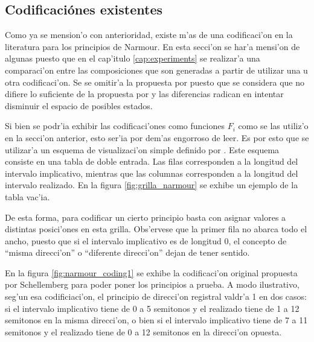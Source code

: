 \subsection{Codificaci\'ones existentes}
Como ya se mension'o con anterioridad, existe m'as de una codificaci'on en la literatura para los principios de Narmour. 
En esta secci'on se har'a mensi'on de algunas puesto que en el cap'itulo \ref{cap:experiments} se realizar'a una comparaci'on
entre las composiciones que son generadas a partir de utilizar una u otra codificaci'on. Se se omitir'a la propuesta por \cite{PaieThesis}
puesto que se considera que no difiere lo suficiente de la propuesta por \cite{Schellenberg97} y las diferencias radican en intentar disminuir
el espacio de posibles estados.


Si bien se podr'ia exhibir las codificaci'ones como funciones $F_i$ como se las utiliz'o en la secci'on anterior, esto ser'ia por dem'as engorroso de leer.
Es por esto que se utilizar'a un esquema de visualizaci'on simple definido por \cite{Narmour91}. Este esquema consiste en una tabla de doble entrada. 
Las filas corresponden a la longitud del intervalo implicativo, mientras que las columnas corresponden a la longitud del intervalo realizado.
En la figura \ref{fig:grilla_narmour} se exhibe un ejemplo de la tabla vac'ia.

\begin{imagen}
    \width{14cm}
\end{imagen}

De esta forma, para codificar un cierto principio basta con asignar valores a distintas posici'ones en esta grilla. Obs'ervese que la primer fila 
no abarca todo el ancho, puesto que si el intervalo implicativo es de longitud 0, el concepto de ``misma direcci'on'' o ``diferente direcci'on'' dejan
de tener sentido.

En la figura \ref{fig:narmour_coding1} se exhibe la codificaci'on original propuesta por Schellemberg para poder poner los principios a prueba.
A modo ilustrativo, seg'un esa codificiaci'on, el principio de direcci'on registral valdr'a 1 en dos casos: si el intervalo implicativo tiene de 0 a 5 semitonos y el 
realizado tiene de 1 a 12 semitonos en la misma direcci'on, o bien si el intervalo implicativo tiene de 7 a 11 semitonos y el realizado tiene de 0 a 12 semitonos 
en la direcci'on opuesta.


